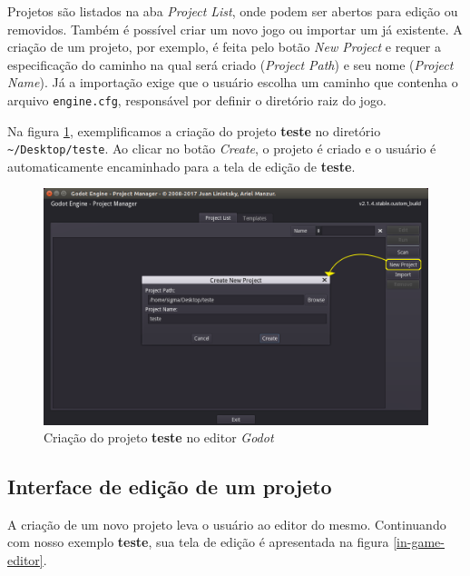 Projetos são listados na aba \textit{Project List}, onde podem ser abertos para edição ou removidos. Também é possível criar um novo jogo ou importar um já existente. A criação de um projeto, por exemplo, é feita pelo botão \textit{New Project} e requer a especificação do caminho na qual será criado (\textit{Project Path}) e seu nome (\textit{Project Name}). Já a importação exige que o usuário escolha um caminho que contenha o arquivo \texttt{engine.cfg}, responsável por definir o diretório raiz do jogo.

Na figura \ref{editor-project-create}, exemplificamos a criação do projeto \textbf{teste} no diretório \texttt{\textasciitilde/Desktop/teste}. Ao clicar no botão \textit{Create}, o projeto é criado e o usuário é automaticamente encaminhado para a tela de edição de \textbf{teste}.

\begin{figure}[H]
  \centering
  \includegraphics[width=.85\textwidth]{image/editor-project-create-edit}
  \caption{Criação do projeto \textbf{teste} no editor \textit{Godot}}
  \label{editor-project-create}
\end{figure}


\subsection{Interface de edição de um projeto}

A criação de um novo projeto leva o usuário ao editor do mesmo. Continuando com nosso exemplo \textbf{teste}, sua tela de edição é apresentada na figura \ref{in-game-editor}.

